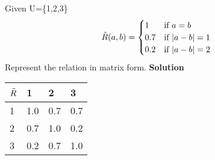 \documentclass{article}
\begin{document}
{\subsection{}
Given U=\{{1,2,3}\}\newline
\begin{equation}
\Tilde{R}(a,b)=
    \begin{cases}
        1 & \text{if } a=b\\
        0.7 & \text{if }|a-b|=1\\
        0.2 & \text{if }|a-b|=2\\
    \end{cases}
\end{equation}
Represent the relation in matrix form.
\newline\textbf{Solution}\newline
\begin{center}
\def\arraystretch{1.4}%
\begin{tabular}{ | m{1.0cm} | m{1.0cm}| m{1cm} | m{1.0cm}| } 
  \hline
  $\Tilde{R}$ & 1 & 2 & 3 \\ 
  \hline
  1 & 1.0 & 0.7 & 0.7 \\ 
  \hline
  2 & 0.7 & 1.0 & 0.2\\ 
  \hline
  3 & 0.2 & 0.7 & 1.0 \\ 
  \hline
\end{tabular}
\end{center}
}
\end{document}
